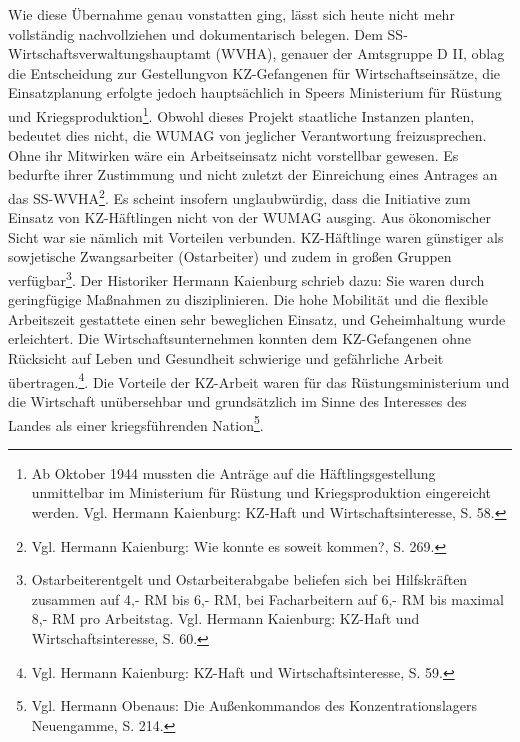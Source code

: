 \documentclass[a4paper,12pt,ngerman,
]{nisebook}
\begin{document}
Wie diese Übernahme genau vonstatten ging, lässt sich heute nicht mehr vollständig nachvollziehen und dokumentarisch belegen. Dem SS-Wirtschaftsverwaltungshauptamt (WVHA), genauer der Amtsgruppe D II, oblag die Entscheidung zur \glqq Gestellung\grqq von KZ-Gefangenen für Wirtschaftseinsätze, die Einsatzplanung erfolgte jedoch hauptsächlich in Speers Ministerium für Rüstung und Kriegsproduktion\footnote{Ab Oktober 1944 mussten die Anträge auf die Häftlingsgestellung unmittelbar im Ministerium für Rüstung und Kriegsproduktion eingereicht werden. Vgl. Hermann Kaienburg: KZ-Haft und Wirtschaftsinteresse, S. 58.}. Obwohl dieses Projekt staatliche Instanzen planten, bedeutet dies nicht, die WUMAG von jeglicher Verantwortung freizusprechen. Ohne ihr Mitwirken wäre ein Arbeitseinsatz nicht vorstellbar gewesen. Es bedurfte ihrer Zustimmung und nicht zuletzt der Einreichung eines Antrages an das SS-WVHA\footnote{Vgl. Hermann Kaienburg: Wie konnte es soweit kommen?, S. 269.}. Es scheint insofern unglaubwürdig, dass die Initiative zum Einsatz von KZ-Häftlingen nicht von der WUMAG ausging. Aus ökonomischer Sicht war sie nämlich mit Vorteilen verbunden. KZ-Häftlinge waren günstiger als sowjetische Zwangsarbeiter (\glqq Ostarbeiter\grqq) und zudem in großen Gruppen verfügbar\footnote{Ostarbeiterentgelt und Ostarbeiterabgabe beliefen sich bei Hilfskräften zusammen auf 4,- RM bis 6,- RM, bei Facharbeitern auf 6,- RM bis maximal 8,- RM pro Arbeitstag. Vgl. Hermann Kaienburg: KZ-Haft und Wirtschaftsinteresse, S. 60.}. Der Historiker Hermann Kaienburg schrieb dazu: \glqq Sie waren durch geringfügige Maßnahmen zu disziplinieren. Die hohe Mobilität und die flexible Arbeitszeit gestattete einen sehr beweglichen Einsatz, und Geheimhaltung wurde erleichtert. Die Wirtschaftsunternehmen konnten dem KZ-Gefangenen ohne Rücksicht auf Leben und Gesundheit schwierige und gefährliche Arbeit übertragen.\grqq\footnote{Vgl. Hermann Kaienburg: KZ-Haft und Wirtschaftsinteresse, S. 59.}. Die Vorteile der KZ-Arbeit waren für das Rüstungsministerium und die Wirtschaft unübersehbar und grundsätzlich im Sinne \glqq des Interesses des Landes als einer kriegsführenden Nation\grqq\footnote{Vgl. Hermann Obenaus: Die Außenkommandos des Konzentrationslagers Neuengamme, S. 214.}.
\newline
\end{document}
